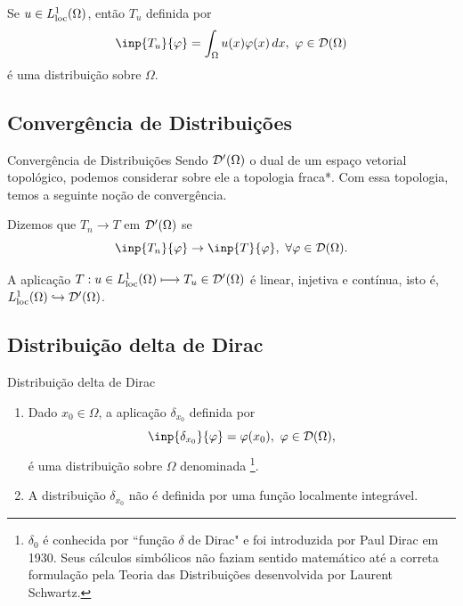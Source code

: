 \begin{frame}
		\begin{exe}
		 	Se $u\in L_{\operatorname{loc}}^1(\Omega)$, então $T_u$ definida por 
				\[\inp{T_u}{\varphi}=\int_\Omega u(x)\varphi(x)\,dx, \ \varphi \in \D(\Omega)\]
				é uma distribuição sobre $\Omega$.
	
	\end{exe}
\end{frame}

\subsection*{Convergência de Distribuições}

\begin{frame}{Convergência de Distribuições}
	Sendo  $\mathcal{D}'(\Omega)$ o  dual de um espaço vetorial topológico, podemos considerar sobre ele a topologia fraca*. Com essa topologia, temos a seguinte noção de convergência.
	
	\begin{defin}
Dizemos que $T_n\to T$ em $\mathcal{D}'(\Omega)$ se
\[\inp{T_n}{\varphi}\to \inp{T}{\varphi},\ \forall \varphi \in \D(\Omega).\]
	\end{defin}
	
	\begin{prop}
	A aplicação $T: u\in L_{\operatorname{loc}}^1(\Omega)\longmapsto T_u \in \mathcal{D}'(\Omega)$ é linear, injetiva e contínua, isto é, $L_{\operatorname{loc}}^1(\Omega)\hookrightarrow \mathcal{D}'(\Omega)$. 	
\end{prop}
\end{frame}

\subsection*{Distribuição delta de Dirac}
\begin{frame}{Distribuição delta de Dirac}
	\begin{exe}
		\begin{enumerate}
			\item 		Dado $x_0\in \Omega $, a aplicação $\delta_{x_0}$ definida por 
			\[\inp{\delta_{x_0}}{\varphi}=\varphi(x_0),\ \varphi\in \D(\Omega),\]
			é uma distribuição sobre $\Omega$ denominada \footnote{$\delta_0$ é conhecida por ``função $\delta$ de Dirac" e foi introduzida por Paul Dirac em 1930. Seus cálculos simbólicos não faziam sentido matemático até a correta formulação pela Teoria das Distribuições desenvolvida por Laurent Schwartz.}.
			
			\item A distribuição $\delta_{x_0}$ não é definida por uma função localmente integrável.
		\end{enumerate}
		
	\end{exe}

\end{frame}

